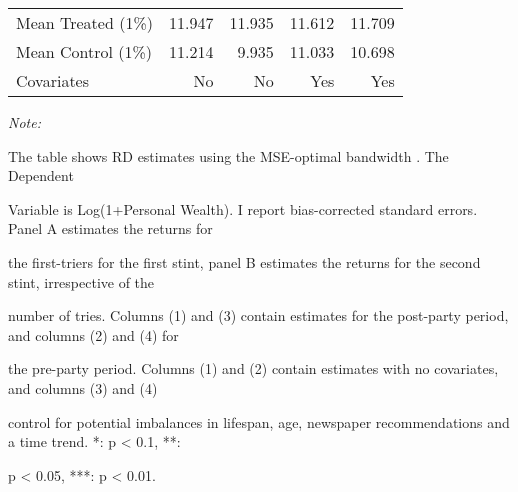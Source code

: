 \begin{table}[!h]
\begin{threeparttable}
\begin{tabular}[t]{lrrrr}
\hspace{1em}Mean Treated (1\%) & 11.947 & 11.935 & 11.612 & 11.709\\
\hspace{1em}Mean Control (1\%) & 11.214 & 9.935 & 11.033 & 10.698\\
\hspace{1em}Covariates & No & No & Yes & Yes\\
\bottomrule
\end{tabular}
\begin{tablenotes}[para]
\item \textit{Note: } 
\item The table shows RD estimates using the MSE-optimal bandwidth \citep{cattaneo2019practical}.  The Dependent
\item Variable is Log(1+Personal Wealth). I report bias-corrected standard errors.  Panel A estimates the returns for
\item the first-triers for the first stint, panel B estimates the returns for the second stint, irrespective of the
\item number of tries. Columns (1) and (3) contain estimates for the post-party period, and columns (2) and (4) for
\item the pre-party period.  Columns (1) and (2) contain estimates with no covariates, and columns (3) and (4)
\item control for potential imbalances in lifespan, age, newspaper recommendations and a time trend. *: p < 0.1, **:
\item p < 0.05, ***: p < 0.01.
\end{tablenotes}
\end{threeparttable}
\end{table}
